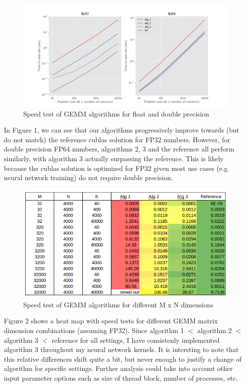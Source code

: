 \documentclass[12pt,letterpaper,twoside]{article}
\begin{document}
\begin{figure}[!htbp]
    \centering
    \includegraphics[scale=0.6]{speed_alg_vs_problem_size.png}
    \caption{Speed test of GEMM algorithms for float and double precision}
\end{figure}

In Figure 1, we can see that our algorithms progressively improve towards
(but do not match) the reference cublas solution for FP32 numbers. However,
for double precision FP64 numbers, algorithms 2, 3 and the reference all
perform similarly, with algorithm 3 actually surpassing the reference.
This is likely because the cublas solution is optimized for FP32 given
most use cases (e.g. neural network training) do not require double
precision.

\begin{figure}[!htbp]
    \centering
    \includegraphics[scale=0.7]{speed_alg_vs_dimensions.png}
    \caption{Speed test of GEMM algorithms for different M x N dimensions}
\end{figure}

Figure 2 shows a heat map with speed tests for different GEMM matrix dimension
combinations (assuming FP32). Since algorithm 1 $<$ algorithm 2 $<$ algorithm 3
$<$ reference for all settings, I have consistenly implemented algorithm 3
throughout my neural network kernels. It is intersting to note that this
relative differences shift quite a bit, but never enough to justify
a change of algorithm for specific settings. Further analysis could take
into account other input parameter options such as size of thread block,
number of processes, etc.
\end{document}
